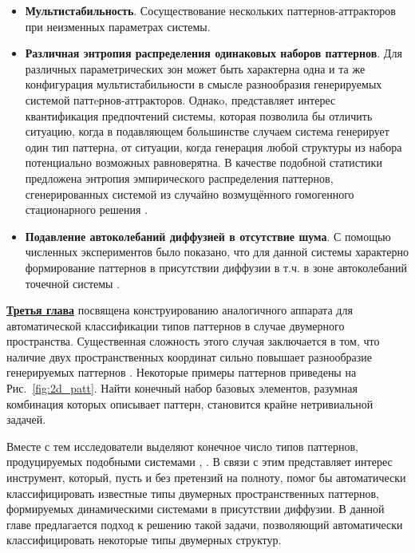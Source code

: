 \begin{itemize}
    \item \textbf{Мультистабильность}. Сосуществование нескольких паттернов-аттракторов при неизменных параметрах системы.
    \item \textbf{Различная энтропия распределения одинаковых наборов паттернов}. Для различных параметрических зон может быть характерна одна и та же конфигурация мультистабильности в смысле разнообразия генерируемых системой паттeрнов-аттракторов. Однакo, представляет интерес квантификация предпочтений системы, которая позволила бы отличить ситуацию, когда в подавляющем большинстве случаем система генерирует один тип паттерна, от ситуации, когда генерация любой структуры из набора потенциально возможных равноверятна. В качестве подобной статистики предложена энтропия \cite{shannon1948mathematical} эмпирического распределения паттернов, сгенерированных системой из случайно возмущённого гомогенного стационарного решения \cite{bib5}.
    \item \textbf{Подавление автоколебаний диффузией в отсутствие шума}. С помощью численных экспериментов было показано, что для данной системы характерно формирование паттернов в присутствии диффузии в т.ч. в зоне автоколебаний точечной системы \cite{bib5}.
\end{itemize}

\underline{\textbf{Третья глава}} посвящена конструированию аналогичного аппарата для автоматической классификации типов паттернов в случае двумерного пространства. Существенная сложность этого случая заключается в том, что наличие двух пространственных координат сильно повышает разнообразие генерируемых паттернов \cite{vanag2004waves}. Некоторые примеры паттернов приведены на Рис.~\ref{fig:2d_patt}. Найти конечный набор базовых элементов, разумная комбинация которых описывает паттерн, становится крайне нетривиальной задачей. 

\begin{figure}[ht]   
\end{figure}

Вместе с тем исследователи выделяют конечное число типов паттернов, продуцируемых подобными системами \cite{vanag2008book}, \cite{maini2019turing}. В связи с этим представляет интерес инструмент, который, пусть и без претензий на полноту, помог бы автоматически классифицировать известные типы двумерных пространственных паттернов, формируемых динамическими системами в присутствии диффузии. В данной главе предлагается подход к решению такой задачи, позволяющий автоматически классифицировать некоторые типы двумерных структур.

